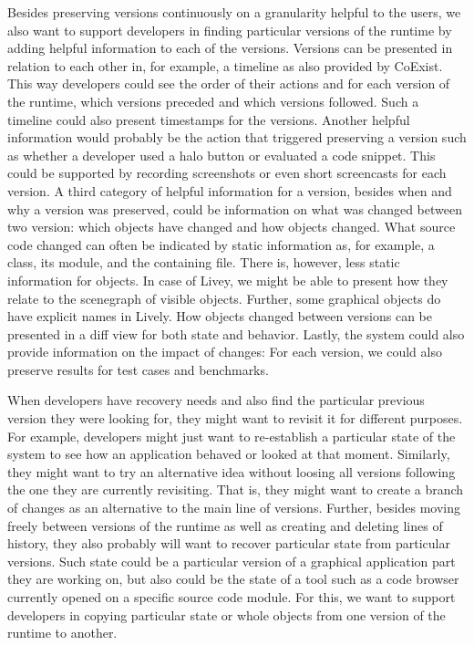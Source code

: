 Besides preserving versions continuously on a granularity helpful to the users, we also want to support developers in finding particular versions of the runtime by adding helpful information to each of the versions.
Versions can be presented in relation to each other in, for example, a timeline as also provided by CoExist.
This way developers could see the order of their actions and for each version of the runtime, which versions preceded and which versions followed.
Such a timeline could also present timestamps for the versions.
Another helpful information would probably be the action that triggered preserving a version such as whether a developer used a halo button or evaluated a code snippet.
This could be supported by recording screenshots or even short screencasts for each version.
A third category of helpful information for a version, besides when and why a version was preserved, could be information on what was changed between two version: which objects have changed and how objects changed.
What source code changed can often be indicated by static information as, for example, a class, its module, and the containing file.
There is, however, less static information for objects.
In case of Livey, we might be able to present how they relate to the scenegraph of visible objects.
Further, some graphical objects do have explicit names in Lively.
How objects changed between versions can be presented in a diff view for both state and behavior.
Lastly, the system could also provide information on the impact of changes: For each version, we could also preserve results for test cases and benchmarks.

When developers have recovery needs and also find the particular previous version they were looking for, they might want to revisit it for different purposes.
For example, developers might just want to re-establish a particular state of the system to see how an application behaved or looked at that moment.
Similarly, they might want to try an alternative idea without loosing all versions following the one they are currently revisiting.
That is, they might want to create a branch of changes as an alternative to the main line of versions.
Further, besides moving freely between versions of the runtime as well as creating and deleting lines of history, they also probably will want to recover particular state from particular versions.
Such state could be a particular version of a graphical application part they are working on, but also could be the state of a tool such as a code browser currently opened on a specific source code module.
For this, we want to support developers in copying particular state or whole objects from one version of the runtime to another.

